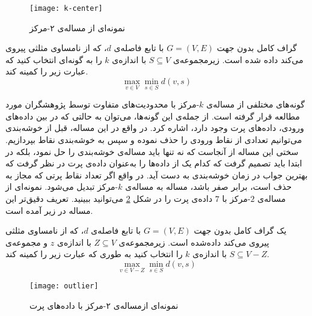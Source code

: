 \begin{figure}[b!]
\centering
\texttt{[image: k-center]}
\caption{نمونه‌ای از ‌مساله‌ی ۲-مرکز}
\label{fig:two:center}
\end{figure}

\begin{prb}[$k$-مرکز]
گراف کامل بدون جهت $G = (V, E)$ با تابع فاصله‌ی $d$، که از نامساوی مثلثی پیروی می‌کند داده ‌شده است. زیرمجموعه‌ی $S \subseteq V$ با اندازه‌ی $k$ را به گونه‌ای انتخاب کنید که عبارت زیر را کمینه کند.
\begin{equation}
\max_{v \in V} \min_{s \in S} d(v, s)
\end{equation}
\end{prb}

گونه‌های مختلفی از مساله‌ی $k$-مرکز با محدودیت‌های متفاوت توسط پژوهشگران مورد مطالعه قرار گرفته است. از جمله‌ی این گونه‌ها، می‌توان به حالتی که در بین داده‌های ورودی، داده‌های پرت وجود دارد، اشاره کرد. در واقع در این مساله، قبل از خوشه‌بندی می‌توانیم تعدادی از نقاط ورودی را حذف نموده و سپس به خوشه‌بندی نقاط بپردازیم. سختی این مساله از آنجاست که نه تنها باید مساله‌ی خوشه‌بندی را حل نمود، بلکه در ابتدا باید تصمیم گرفت که کدام یک از داده‌ها را به‌عنوان داده‌ی پرت در نظر گرفت که بهترین جواب در زمان خوشه‌بندی به دست آید. در واقع اگر تعداد نقاط پرتی که مجاز به حذف است، برابر صفر باشد، مساله به مساله‌ی $k$-مرکز تبدیل می‌شود. نمونه‌ای از مساله‌ی $2$-مرکز با $7$ داده‌ی پرت را در شکل \ref{fig:two:center:outlier} می‌توانید ببینید. تعریف دقیق‌تر این مساله در زیر آمده است.

\begin{prb}
یک گراف کامل بدون جهت $G = (V, E)$ با تابع فاصله‌ی $d$، که از نامساوی مثلثی پیروی می‌کند داده‌شده است. زیرمجموعه‌ی $Z \subseteq V$ با اندازه‌ی $z$ و  مجموعه‌ی $S \subseteq V - Z$ با اندازه‌ی $k$ را انتخاب کنید به‌ طوری ‌که عبارت زیر را کمینه کند.
\begin{equation}
\max_{v \in V - Z} \min_{s \in S} d(v, s)
\end{equation}
\end{prb}

\begin{figure}[b!]
\centering
\texttt{[image: outlier]}
\caption{نمونه‌ای از‌مساله‌ی ۲-مرکز با داده‌های پرت}
\label{fig:two:center:outlier}
\end{figure}

